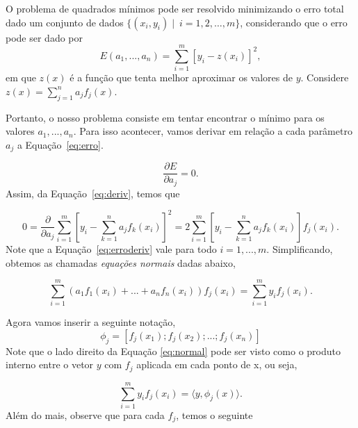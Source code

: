 \documentclass[
	12pt,				%
    oneside,			%
	a4paper,			%
	english,			%
	french,				%
	spanish,			%
	brazil,				%
	]{abntex2}
\begin{document}
            O problema de quadrados mínimos pode ser resolvido minimizando o erro total dado um conjunto de dados  $\{(x_i,y_i)\mid\ i=1,2,\dots,m\}$, considerando que o erro pode ser dado por
            \begin{equation}\label{eq:erro}
                E(a_1,...,a_n) = \sum\limits_{i=1}^m[y_i -z(x_i)]^2,
            \end{equation}
            em que $z(x)$ é a função que tenta melhor aproximar os valores de $y$. Considere $z(x) = \sum\limits_{j=1}^n a_{j}f_{j}(x)$.

            Portanto, o nosso problema consiste em tentar encontrar o mínimo para os valores $a_1,...,a_n$. Para isso acontecer, vamos derivar em relação a cada parâmetro $a_j$ a Equação~\eqref{eq:erro}.

            \begin{equation}\label{eq:deriv}
                \frac{\partial E}{\partial a_j} = 0.
            \end{equation}
            Assim, da Equação~\eqref{eq:deriv}, temos que

            \begin{equation}\label{eq:erroderiv}
                0 = \frac{\partial}{\partial a_j}\sum\limits_{i=1}^m[y_i - \sum\limits_{k=1}^n a_{j}f_{k}(x_i)]^2 = 2\sum\limits_{i=1}^m[y_i - \sum\limits_{k=1}^n a_{j}f_{k}(x_i)]f_j(x_i).
            \end{equation}
            Note que a Equação~\eqref{eq:erroderiv} vale para todo $i=1,...,m$. Simplificando, obtemos as chamadas \emph{equações normais} dadas abaixo,

            \begin{equation}\label{eq:normal}
                \sum\limits_{i=1}^m (a_{1}f_{1}(x_i) + ... + a_{n}f_{n}(x_i))f_{j}(x_i) = \sum\limits_{i=1}^m y_{i}f_{j}(x_i).
            \end{equation}

            Agora vamos inserir a seguinte notação,
            \begin{equation*}
                \phi_{j} = [f_j(x_1); f_j(x_2); ...; f_j(x_n) ]
            \end{equation*}
            Note que o lado direito da Equação \eqref{eq:normal} pode ser visto como o produto interno entre o vetor $y$ com $f_{j}$ aplicada em cada ponto de x, ou seja,

            \begin{equation}\label{eq:y}
                \sum\limits_{i=1}^m y_{i}f_{j}(x_i) = \langle y, \phi_{j}(x) \rangle.
            \end{equation}
            Além do mais, observe que para cada $f_{j}$, temos o seguinte
\end{document}

